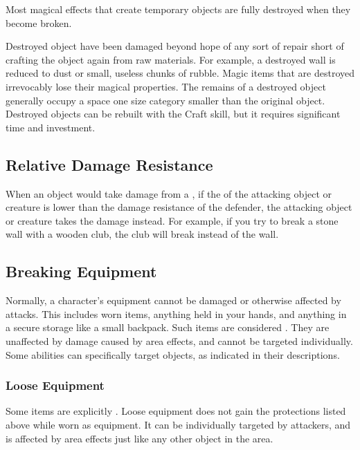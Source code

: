     Most magical effects that create temporary objects are fully destroyed when they become broken.

    Destroyed object have been damaged beyond hope of any sort of repair short of crafting the object again from raw materials.
    For example, a destroyed wall is reduced to dust or small, useless chunks of rubble.
    Magic items that are destroyed irrevocably lose their magical properties.
    The remains of a destroyed object generally occupy a space one size category smaller than the original object.
    Destroyed objects can be rebuilt with the Craft skill, but it requires significant time and investment.

  \subsection{Relative Damage Resistance}\label{Relative Damage Resistance}
    When an object would take damage from a , if the  of the attacking object or creature is lower than the damage resistance of the defender, the attacking object or creature takes the damage instead.
    For example, if you try to break a stone wall with a wooden club, the club will break instead of the wall.

  \subsection{Breaking Equipment}\label{Breaking Equipment}
    Normally, a character's equipment cannot be damaged or otherwise affected by attacks.
    This includes worn items, anything held in your hands, and anything in a secure storage like a small backpack.
    Such items are considered .
    They are unaffected by damage caused by area effects, and cannot be targeted individually.
    Some abilities can specifically target  objects, as indicated in their descriptions.

    \subsubsection{Loose Equipment}\label{Loose Equipment}
      Some items are explicitly .
      Loose equipment does not gain the protections listed above while worn as equipment.
      It can be individually targeted by attackers, and is affected by area effects just like any other object in the area.

